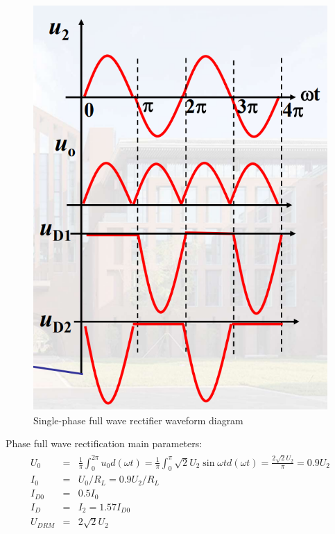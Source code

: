 \documentclass[UTF8]{article}
\begin{document}
    	\begin{figure}[H]
    	    	\centering
    	    	\includegraphics[clip,scale=0.65,trim={0 0 0 0}]{fig/fig8.png}
    	        \caption{Single-phase full wave rectifier waveform diagram}
    	        \label{figure.8}
        \end{figure}  
   
   Phase full wave rectification main parameters:
  \begin{eqnarray}
      \begin{matrix}
       U_{0}&=&\frac{1}{\pi} \int_{0}^{2 \pi} u_{0} d(\omega t)=\frac{1}{\pi} \int_{0}^{\pi} \sqrt{2} U_{2} \sin \omega t d(\omega t)=\frac{ 2\sqrt{2} U_{2}}{\pi}=0.9 U_{2}\\
       I_{0}&=&U_{0} / R_{L}=0.9 U_{2} / R_{L}\\
       I_{D0} &=& 0.5I_0\\
       I_{D}&=&I_{2} =1.57I_{D0}\\
       U_{D R M}&=&2\sqrt{2} U_{2}
      \end{matrix}
  \end{eqnarray}
   
\end{document}
